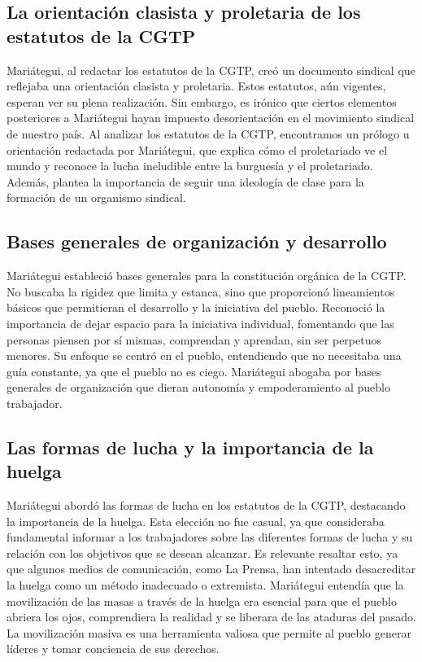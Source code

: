 \documentclass[
  letterpaper,
  DIV=11,
  numbers=noendperiod]{scrartcl}
\begin{document}
\hypertarget{la-orientaciuxf3n-clasista-y-proletaria-de-los-estatutos-de-la-cgtp}{%
\subsection{La orientación clasista y proletaria de los estatutos de la
CGTP}\label{la-orientaciuxf3n-clasista-y-proletaria-de-los-estatutos-de-la-cgtp}}

Mariátegui, al redactar los estatutos de la CGTP, creó un documento
sindical que reflejaba una orientación clasista y proletaria. Estos
estatutos, aún vigentes, esperan ver su plena realización. Sin embargo,
es irónico que ciertos elementos posteriores a Mariátegui hayan impuesto
desorientación en el movimiento sindical de nuestro país. Al analizar
los estatutos de la CGTP, encontramos un prólogo u orientación redactada
por Mariátegui, que explica cómo el proletariado ve el mundo y reconoce
la lucha ineludible entre la burguesía y el proletariado. Además,
plantea la importancia de seguir una ideología de clase para la
formación de un organismo sindical.

\hypertarget{bases-generales-de-organizaciuxf3n-y-desarrollo}{%
\subsection{Bases generales de organización y
desarrollo}\label{bases-generales-de-organizaciuxf3n-y-desarrollo}}

Mariátegui estableció bases generales para la constitución orgánica de
la CGTP. No buscaba la rigidez que limita y estanca, sino que
proporcionó lineamientos básicos que permitieran el desarrollo y la
iniciativa del pueblo. Reconoció la importancia de dejar espacio para la
iniciativa individual, fomentando que las personas piensen por sí
mismas, comprendan y aprendan, sin ser perpetuos menores. Su enfoque se
centró en el pueblo, entendiendo que no necesitaba una guía constante,
ya que el pueblo no es ciego. Mariátegui abogaba por bases generales de
organización que dieran autonomía y empoderamiento al pueblo trabajador.

\hypertarget{las-formas-de-lucha-y-la-importancia-de-la-huelga}{%
\subsection{Las formas de lucha y la importancia de la
huelga}\label{las-formas-de-lucha-y-la-importancia-de-la-huelga}}

Mariátegui abordó las formas de lucha en los estatutos de la CGTP,
destacando la importancia de la huelga. Esta elección no fue casual, ya
que consideraba fundamental informar a los trabajadores sobre las
diferentes formas de lucha y su relación con los objetivos que se desean
alcanzar. Es relevante resaltar esto, ya que algunos medios de
comunicación, como La Prensa, han intentado desacreditar la huelga como
un método inadecuado o extremista. Mariátegui entendía que la
movilización de las masas a través de la huelga era esencial para que el
pueblo abriera los ojos, comprendiera la realidad y se liberara de las
ataduras del pasado. La movilización masiva es una herramienta valiosa
que permite al pueblo generar líderes y tomar conciencia de sus
derechos.
\end{document}
